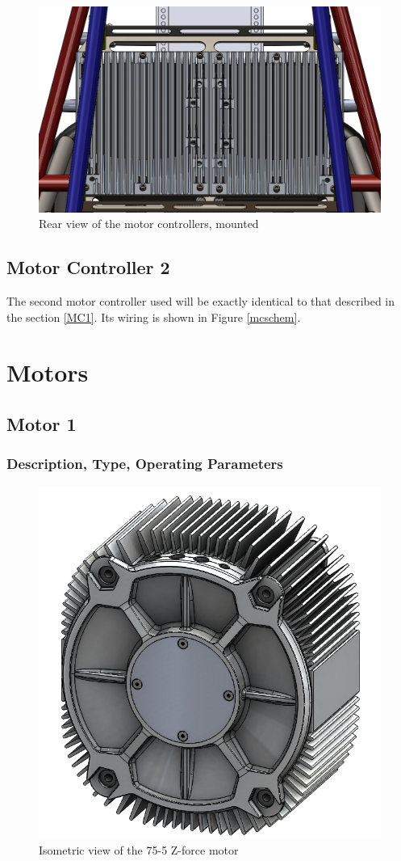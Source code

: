 \documentclass{article}
\begin{document}
            \begin{figure}[H]
                \centering
                \includegraphics[width = 0.6 \textwidth]{motorcontroller_rearview}
                \caption{Rear view of the motor controllers, mounted}
                \label{mcrearview}
            \end{figure}

    \subsection{Motor Controller 2} \label{MC2}

        The second motor controller used will be exactly identical to that described in the section \ref{MC1}. Its wiring is shown in Figure \ref{mcschem}.

\newpage

\section{Motors} \label{Motors}

    \subsection{Motor 1} \label{M1}

        \subsubsection{Description, Type, Operating Parameters}


            \begin{figure}[H]
                \centering
                \includegraphics[width = 0.5 \textwidth]{motor_isorear}
                \caption{Isometric view of the 75-5 Z-force motor}
                \label{motoriso}
            \end{figure}
\end{document}
